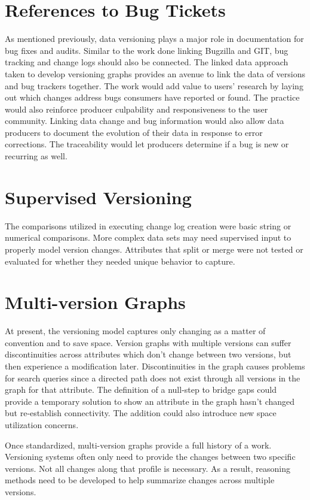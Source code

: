 \section{References to Bug Tickets}

As mentioned previously, data versioning plays a major role in documentation for bug fixes and audits.
Similar to the work done linking Bugzilla and GIT, bug tracking and change logs should also be connected.
The linked data approach taken to develop versioning graphs provides an avenue to link the data of versions and bug trackers together.
The work would add value to users' research by laying out which changes address bugs consumers have reported or found.
The practice would also reinforce producer culpability and responsiveness to the user community.
Linking data change and bug information would also allow data producers to document the evolution of their data in response to error corrections.
The traceability would let producers determine if a bug is new or recurring as well.

\section{Supervised Versioning}

The comparisons utilized in executing change log creation were basic string or numerical comparisons.
More complex data sets may need supervised input to properly model version changes.
Attributes that split or merge were not tested or evaluated for whether they needed unique behavior to capture.

\section{Multi-version Graphs}

At present, the versioning model captures only changing as a matter of convention and to save space.
Version graphs with multiple versions can suffer discontinuities across attributes which don't change between two versions, but then experience a modification later.
Discontinuities in the graph causes problems for search queries since a directed path does not exist through all versions in the graph for that attribute.
The definition of a null-step to bridge gaps could provide a temporary solution to show an attribute in the graph hasn't changed but re-establish connectivity.
The addition could also introduce new space utilization concerns.

Once standardized, multi-version graphs provide a full history of a work.
Versioning systems often only need to provide the changes between two specific versions.
Not all changes along that profile is necessary.
As a result, reasoning methods need to be developed to help summarize changes across multiple versions.

